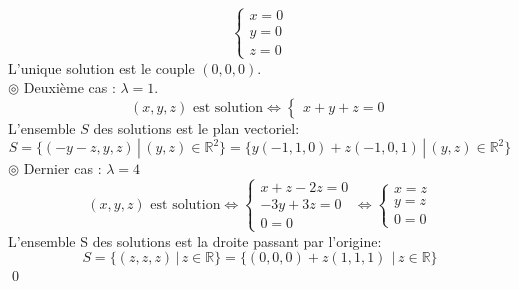 \documentclass[10pt]{article}
\begin{document}
\begin{tcolorbox}[enhanced, width=7in, center, size=fbox, fontupper=\large, drop shadow southwest]
\begin{equation*}
\begin{cases}
            x=0\\
            y=0\\
            z=0
        \end{cases}
    \end{equation*}
    L'unique solution est le couple $(0,0,0)$.\\
    $\circledcirc$ Deuxième cas : $\lambda=1$.
    \begin{equation*}
        (x,y,z) \text{ est solution}
        \iff\begin{cases}
            x+y+z=0
        \end{cases}
    \end{equation*}
    L'ensemble $S$ des solutions est le plan vectoriel: 
    \begin{equation*}
        S=\{(-y-z,y,z)\,|\, (y,z)\in\mathbb{R}^2\}=\{y(-1,1,0) + z(-1,0,1)\,|\,(y,z)\in\mathbb{R}^2\}
    \end{equation*}
    $\circledcirc$ Dernier cas : $\lambda=4$
    \begin{equation*}
        (x,y,z) \text{ est solution} \iff \begin{cases}
            x+z-2z=0\\
            -3y+3z=0\\
            0=0
        \end{cases}
        \iff\begin{cases}
            x=z\\
            y=z\\
            0=0
        \end{cases}
    \end{equation*}
    L'ensemble S des solutions est la droite passant par l'origine:
    \begin{equation*}
        S = \{(z,z,z)\,|\,z\in\mathbb{R}\} = \{(0,0,0) + z(1,1,1)\ \,|\, z\in\mathbb{R}\}
    \end{equation*} 
    \qed
\end{tcolorbox}

\end{document}
